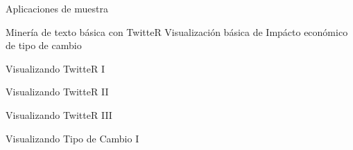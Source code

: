 \documentclass{IFFranciscoME}\usepackage[]{graphicx}\usepackage[]{color}
\begin{document}

\begin{frame}{Aplicaciones de muestra}

Miner\'ia de texto b\'asica con TwitteR
Visualizaci\'on b\'asica de Imp\'acto econ\'omico de tipo de cambio

\end{frame}


\begin{frame}{Visualizando TwitteR I}

\end{frame}


\begin{frame}{Visualizando TwitteR II}

\end{frame}


\begin{frame}{Visualizando TwitteR III}

\end{frame}


\begin{frame}{Visualizando Tipo de Cambio I}

\end{frame}
\end{document}
